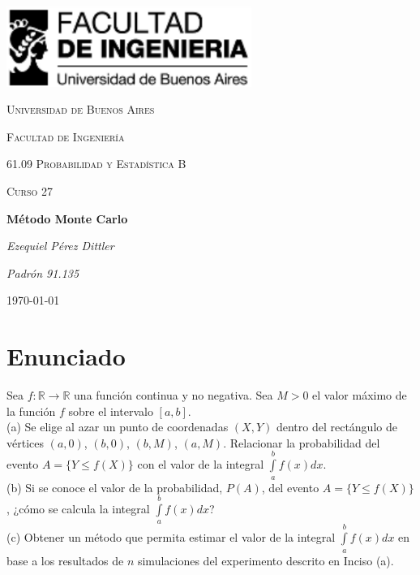 \documentclass[a4paper]{article}
\begin{document}
\begin{titlepage}
  \centering
  \includegraphics[width=0.6\textwidth]{logo_fiuba.pdf}\par\vspace{1cm}
  {\scshape\LARGE Universidad de Buenos Aires \par}
  {\scshape\LARGE Facultad de Ingeniería \par}
  \vspace{1cm}
  {\scshape\Large 61.09 Probabilidad y Estadística B\par}
  {\scshape\Large Curso 27\par}
  \vspace{1.5cm}
  {\huge\bfseries Método Monte Carlo\par}
  \vspace{2cm}
  {\Large\itshape Ezequiel Pérez Dittler \par}
  {\Large\itshape Padrón 91.135 \par}

  \vfill

  {\large \today\par}
\end{titlepage}

\newpage

\section{Enunciado}
Sea $f: \mathbb{R} \to \mathbb{R}$ una función continua y no negativa.
Sea $M > 0$ el valor máximo de la función $f$ sobre el intervalo $[a, b]$. \\

(a) Se elige al azar un punto de coordenadas $(X, Y)$ dentro del rectángulo de
vértices $(a, 0)$, $(b, 0)$, $(b, M)$, $(a, M)$. Relacionar la probabilidad
del evento $A = \{ Y \leqslant f(X) \}$ con el valor de la integral
$\int\limits_a^b f(x) dx$. \\

(b) Si se conoce el valor de la probabilidad, $P(A)$, del evento
$A = \{ Y \leqslant f(X) \}$, ¿cómo se calcula la integral
$\int\limits_a^b f(x) dx$? \\

(c) Obtener un método que permita estimar el valor de la integral
$\int\limits_a^b f(x) dx$ en base a los resultados de $n$ simulaciones del
experimento descrito en Inciso (a). \\
\end{document}
